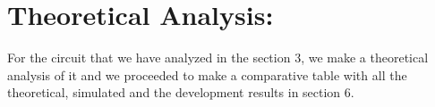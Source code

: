 \section{Theoretical Analysis:}

For the circuit that we have analyzed in the section 3, we make a theoretical analysis of it and we proceeded to make a comparative table with all the theoretical, simulated and the development results in section 6. \hfill \break
